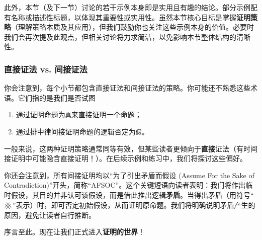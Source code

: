 此外，本节（及下一节）讨论的若干示例本身即是实用且有趣的结论。部分示例配有名称或描述性标题，以体现其重要性或实用性。虽然本节核心目标是掌握\textbf{证明策略}（理解策略本质及其应用），但我们鼓励你也关注这些示例本身的价值。必要时我们会再次提及此观点，但相关讨论将力求简洁，以免影响本节整体结构的清晰性。

\subsubsection*{直接证法 vs. 间接证法}

你会注意到，每个小节都包含直接证法和间接证法的策略。你可能还不熟悉这些术语。它们指的是我们是否试图
\begin{enumerate}[label=(\arabic*)]
    \item 通过证明命题为\verb|真|来直接证明一个命题；
    \item 通过排中律间接证明命题的逻辑否定为\verb|假|。
\end{enumerate}

一般来说，这两种证明策略通常同等有效，但某些读者更倾向于\textbf{直接}证法（有时间接证明中可能隐含直接证明！）。在后续示例和练习中，我们将探讨这些偏好。

你还会注意到，所有间接证明均以``为了引出矛盾而假设 (Assume For the Sake of Contradiction)''开头，简称``AFSOC''。这个关键短语向读者表明：我们将作出临时假设，其目的并非认可该假设，而是借此推出逻辑\textbf{矛盾}。当得出矛盾（用符号``$\hashx$''表示）时，即可否定初始假设，从而证明原命题。我们将明确说明矛盾产生的原因，避免让读者自行推断。

序言至此。现在让我们正式进入\textbf{证明的世界}！

\clearpage

















